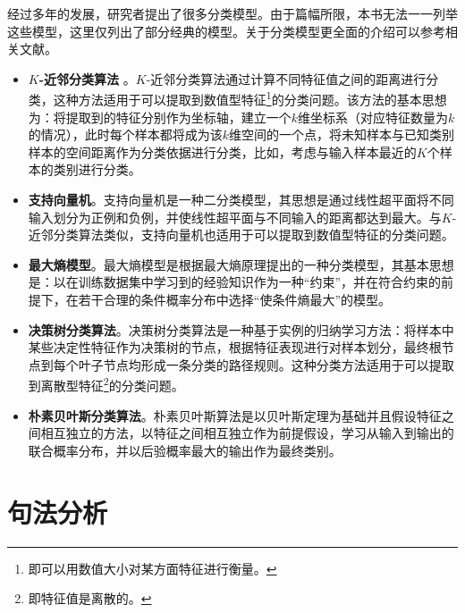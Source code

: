 \parinterval 经过多年的发展，研究者提出了很多分类模型。由于篇幅所限，本书无法一一列举这些模型，这里仅列出了部分经典的模型。关于分类模型更全面的介绍可以参考相关文献。

\begin{itemize}
\vspace{0.5em}
\item{\small\sffamily\bfseries{$K$-近邻分类算法}} 。$K$-近邻分类算法通过计算不同特征值之间的距离进行分类，这种方法适用于可以提取到数值型特征\footnote{即可以用数值大小对某方面特征进行衡量。}的分类问题。该方法的基本思想为：将提取到的特征分别作为坐标轴，建立一个$k$维坐标系（对应特征数量为$k$的情况），此时每个样本都将成为该$k$维空间的一个点，将未知样本与已知类别样本的空间距离作为分类依据进行分类，比如，考虑与输入样本最近的$K$个样本的类别进行分类。
\vspace{0.5em}
\item {\small\sffamily\bfseries{支持向量机}}。支持向量机是一种二分类模型，其思想是通过线性超平面将不同输入划分为正例和负例，并使线性超平面与不同输入的距离都达到最大。与$K$-近邻分类算法类似，支持向量机也适用于可以提取到数值型特征的分类问题。
\vspace{0.5em}
\item {\small\sffamily\bfseries{最大熵模型}}。最大熵模型是根据最大熵原理提出的一种分类模型，其基本思想是：以在训练数据集中学习到的经验知识作为一种“约束”，并在符合约束的前提下，在若干合理的条件概率分布中选择“使条件熵最大”的模型。
\vspace{0.5em}
\item {\small\sffamily\bfseries{决策树分类算法}}。决策树分类算法是一种基于实例的归纳学习方法：将样本中某些决定性特征作为决策树的节点，根据特征表现进行对样本划分，最终根节点到每个叶子节点均形成一条分类的路径规则。这种分类方法适用于可以提取到离散型特征\footnote{即特征值是离散的。}的分类问题。
\vspace{0.5em}
\item {\small\sffamily\bfseries{朴素贝叶斯分类算法}}。朴素贝叶斯算法是以贝叶斯定理为基础并且假设特征之间相互独立的方法，以特征之间相互独立作为前提假设，学习从输入到输出的联合概率分布，并以后验概率最大的输出作为最终类别。
\vspace{0.5em}
\end{itemize}

\sectionnewpage
\section{句法分析}

